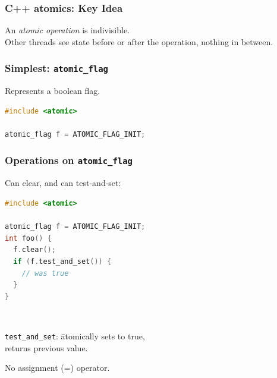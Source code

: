 \begin{frame}[fragile]
  \frametitle{C++ atomics: Key Idea}
  
    An \emph{atomic operation} is indivisible.\\[1em]
    Other threads see state before or after the operation,
    nothing in between.
  
\end{frame}

\begin{frame}[fragile]
  \frametitle{Simplest: {\tt atomic\_flag}}
  
    Represents a boolean flag.\\[1em]
    \begin{lstlisting}[language=C]
#include <atomic>

atomic_flag f = ATOMIC_FLAG_INIT;
    \end{lstlisting}
  
\end{frame}

\begin{frame}[fragile]
  \frametitle{Operations on {\tt atomic\_flag}}
  
    Can clear, and can test-and-set:
    \begin{lstlisting}[language=C]
#include <atomic>

atomic_flag f = ATOMIC_FLAG_INIT;
int foo() {
  f.clear();
  if (f.test_and_set()) {
    // was true
  }
}
    \end{lstlisting}
    ~\\
    \begin{tabbing}
      {\tt test\_and\_set}: \= atomically sets to true, \\
      \> returns previous value.
    \end{tabbing}
    No assignment (=) operator.
  
\end{frame}



